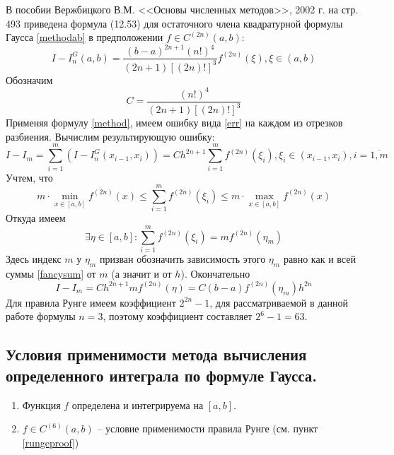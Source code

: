 \documentclass[a4paper, 12pt]{article}
\begin{document}
	В пособии Вержбицкого В.М. <<Основы численных методов>>, 2002 г. на стр. 493 приведена формула (12.53) для остаточного члена квадратурной формулы Гаусса \eqref{methodab} в предположении $f\in C^{(2n)}(a,b)$:
	\begin{equation} \label{err}
		I-I^G_n(a,b)=\frac{(b-a)^{2n+1}(n!)^4}{(2n+1)[(2n)!]^3}f^{(2n)}(\xi), \xi\in(a,b)
	\end{equation}
	Обозначим 
	\begin{equation*}
	C=\dfrac{(n!)^4}{(2n+1)[(2n)!]^3}
	\end{equation*}
	Применяя формулу \eqref{method}, имеем ошибку вида \eqref{err} на каждом из отрезков разбиения. Вычислим результирующую ошибку:
	\begin{equation}
		I-I_m=\sum\limits_{i=1}^m(I-I^G_n(x_{i-1},x_i))=Ch^{2n+1}\sum\limits_{i=1}^mf^{(2n)}(\xi_i), \xi_i\in(x_{i-1},x_i), i=\overline{1,m}
	\end{equation}
	Учтем, что
	\begin{equation}
		m\cdot \min\limits_{x\in[a,b]}f^{(2n)}(x)\leq\sum\limits_{i=1}^mf^{(2n)}(\xi_i)\leq m\cdot \max\limits_{x\in[a,b]}f^{(2n)}(x)
	\end{equation}
	Откуда имеем
	\begin{equation} \label{fancysum}
		\exists \eta\in[a,b]: \sum\limits_{i=1}^mf^{(2n)}(\xi_i)=mf^{(2n)}(\eta_m)
	\end{equation}
	Здесь индекс $m$ у $\eta_m$ призван обозначить зависимость этого $\eta_m$ равно как и всей суммы \eqref{fancysum} от $m$ (а значит и от $h$). Окончательно
	\begin{equation}
		I-I_m=Ch^{2n+1}mf^{(2n)}(\eta)=C(b-a)f^{(2n)}(\eta_m)h^{2n}
	\end{equation}
	Для правила Рунге имеем коэффициент $2^{2n}-1$, для рассматриваемой в данной работе формулы $n=3$, поэтому коэффициент составляет $2^6-1=63$.
	
	\subsection{Условия применимости метода вычисления определенного интеграла по формуле Гаусса.}
	
	\begin{enumerate}
		\item Функция $f$ определена и интегрируема на $[a,b]$.
		\item $f\in C^{(6)}(a,b)$ -- условие применимости правила Рунге (см. пункт \ref{rungeproof})
	\end{enumerate}
	
\end{document}
